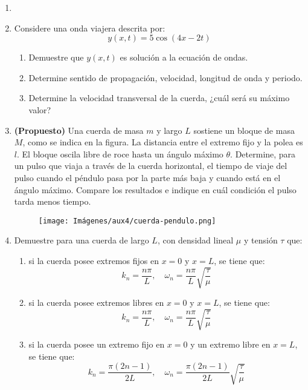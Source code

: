 \documentclass[letterpaper,11pt]{article}
\begin{document}
\vspace{-1cm}
\begin{enumerate}\setlength{\itemsep}{0.4cm}


\item[]

\item Considere una onda viajera descrita por:
\[ y(x,t) = 5 \cos{(4x-2t)}\]
    \begin{enumerate}
        \item Demuestre que $y(x,t)$ es solución a la ecuación de ondas.
        \item Determine sentido de propagación, velocidad, longitud de onda y periodo.
        \item Determine la velocidad transversal de la cuerda, ¿cuál será su máximo valor?
    \end{enumerate}

\item \textbf{(Propuesto)} Una cuerda  de  masa  $m$  y  largo  $L$  sostiene  un  bloque  de  masa  $M$,  como  se  indica  en la  figura. La distancia entre el extremo fijo y la polea es $l$. El bloque oscila libre de roce hasta un ángulo  máximo  $\theta$.  Determine,  para  un  pulso  que  viaja  a  través  de  la  cuerda  horizontal,  el  tiempo  de  viaje  del  pulso  cuando  el  péndulo  pasa  por  la  parte  más  baja  y  cuando  está  en  el  ángulo  máximo. Compare  los  resultados  e  indique  en  cuál  condición  el  pulso  tarda  menos  tiempo.

\begin{figure}[h!]
    \centering
    \texttt{[image: Imágenes/aux4/cuerda-pendulo.png]}
\end{figure}

\item Demuestre para una cuerda de largo $L$, con densidad lineal $\mu$ y tensión $\tau$ que:
    \begin{enumerate}
        \item si la cuerda posee extremos fijos en $x=0$ y $x=L$, se tiene que:
        \[k_n = \frac{n\pi}{L}, \quad \omega_n = \frac{n\pi}{L}\sqrt{\frac{\tau}{\mu}}\]
        
        \item si la cuerda posee extremos libres en $x=0$ y $x=L$, se tiene que:
        \[k_n = \frac{n\pi}{L}, \quad \omega_n = \frac{n\pi}{L}\sqrt{\frac{\tau}{\mu}}\]
        
        \item si la cuerda posee un extremo fijo en $x=0$ y un extremo libre en $x=L$, se tiene que:
        \[k_n = \frac{\pi(2n-1)}{2L}, \quad \omega_n = \frac{\pi(2n-1)}{2L}\sqrt{\frac{\tau}{\mu}}\]
    \end{enumerate}


\end{enumerate}
\end{document}
